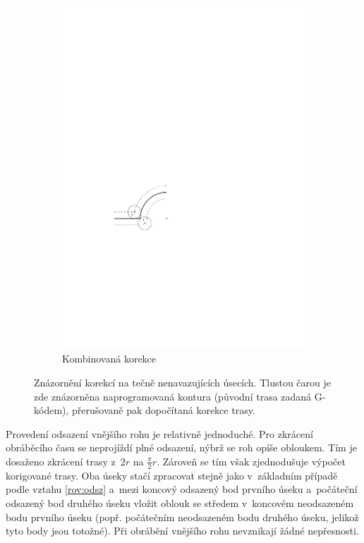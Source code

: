\begin{figure}[h]
\begin{subfigure}[b]{0.3\textwidth}
						\includegraphics[width=\textwidth]{img/korekce-komb-dva.pdf}
						\caption{Kombinovaná korekce}
					\end{subfigure}
				\caption{Znázornění korekcí na tečně nenavazujících úsecích. Tlustou čarou je zde znázorněna naprogramovaná kontura (původní trasa zadaná G-kódem), přerušovaně pak dopočítaná korekce trasy.}\label{obr:kor-netec}
			\end{figure}
			
			Provedení odsazení vnějšího rohu je relativně jednoduché. Pro zkrácení obráběcího času se neprojíždí plné odsazení, nýbrž se roh opíše obloukem\cite{heid}. Tím je dosaženo zkrácení trasy z~$2r$ na $\frac{\pi}{2}r$. Zároveň se tím však zjednodušuje výpočet korigované trasy. Oba úseky stačí zpracovat stejně jako v~základním případě podle vztahu \ref{rov:odsz} a~mezi koncový odsazený bod prvního úseku a~počáteční odsazený bod druhého úseku vložit oblouk se středem v~koncovém neodsazeném bodu prvního úseku (popř. počátečním neodsazeném bodu druhého úseku, jelikož tyto body jsou totožné). Při obrábění vnějšího rohu nevznikají žádné nepřesnosti.
			
